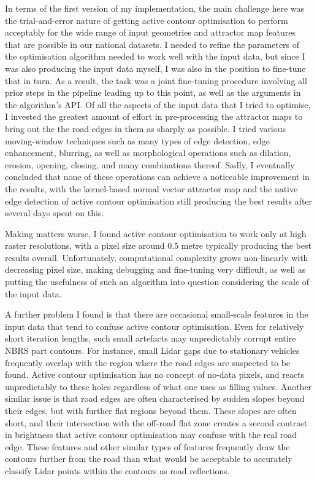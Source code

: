 In terms of the first version of my implementation, the main challenge here was the trial-and-error nature of getting active contour optimisation to perform acceptably for the wide range of input geometries and attractor map features that are possible in our national datasets. I needed to refine the parameters of the optimisation algorithm needed to work well with the input data, but since I was also producing the input data myself, I was also in the position to fine-tune that in turn. As a result, the task was a joint fine-tuning procedure involving all prior steps in the pipeline leading up to this point, as well as the arguments in the algorithm's API. Of all the aspects of the input data that I tried to optimise, I invested the greatest amount of effort in pre-processing the attractor maps to bring out the the road edges in them as sharply as possible. I tried various moving-window techniques such as many types of edge detection, edge enhancement, blurring, as well as morphological operations such as dilation, erosion, opening, closing, and many combinations thereof. Sadly, I eventually concluded that none of these operations can achieve a noticeable improvement in the results, with the kernel-based normal vector attractor map and the native edge detection of active contour optimisation still producing the best results after several days spent on this.

Making matters worse, I found active contour optimisation to work only at high raster resolutions, with a pixel size around 0.5 metre typically producing the best results overall. Unfortunately, computational complexity grows non-linearly with decreasing pixel size, making debugging and fine-tuning very difficult, as well as putting the usefulness of such an algorithm into question considering the scale of the input data.

A further problem I found is that there are occasional small-scale features in the input data that tend to confuse active contour optimisation. Even for relatively short iteration lengths, such small artefacts may unpredictably corrupt entire NBRS part contours. For instance, small Lidar gaps due to stationary vehicles frequently overlap with the region where the road edges are suspected to be found. Active contour optimisation has no concept of no-data pixels, and reacts unpredictably to these holes regardless of what one uses as filling values. Another similar issue is that road edges are often characterised by sudden slopes beyond their edges, but with further flat regions beyond them. These slopes are often short, and their intersection with the off-road flat zone creates a second contrast in brightness that active contour optimisation may confuse with the real road edge. These features and other similar types of features frequently draw the contours further from the road than what would be acceptable to accurately classify Lidar points within the contours as road reflections.


